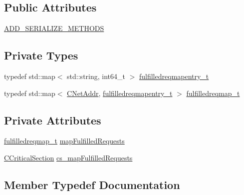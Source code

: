 \subsection*{Public Attributes}
\begin{DoxyCompactItemize}
\item 
\mbox{\hyperlink{class_c_net_fulfilled_request_manager_a252b6b3f7606d6a8de6e9506c1d09621}{A\+D\+D\+\_\+\+S\+E\+R\+I\+A\+L\+I\+Z\+E\+\_\+\+M\+E\+T\+H\+O\+DS}}
\end{DoxyCompactItemize}
\subsection*{Private Types}
\begin{DoxyCompactItemize}
\item 
typedef std\+::map$<$ std\+::string, int64\+\_\+t $>$ \mbox{\hyperlink{class_c_net_fulfilled_request_manager_abd91edcf71a75eb9459f0e5997d39570}{fulfilledreqmapentry\+\_\+t}}
\item 
typedef std\+::map$<$ \mbox{\hyperlink{class_c_net_addr}{C\+Net\+Addr}}, \mbox{\hyperlink{class_c_net_fulfilled_request_manager_abd91edcf71a75eb9459f0e5997d39570}{fulfilledreqmapentry\+\_\+t}} $>$ \mbox{\hyperlink{class_c_net_fulfilled_request_manager_a08e49de0fb5f459a2238c98720b1b420}{fulfilledreqmap\+\_\+t}}
\end{DoxyCompactItemize}
\subsection*{Private Attributes}
\begin{DoxyCompactItemize}
\item 
\mbox{\hyperlink{class_c_net_fulfilled_request_manager_a08e49de0fb5f459a2238c98720b1b420}{fulfilledreqmap\+\_\+t}} \mbox{\hyperlink{class_c_net_fulfilled_request_manager_af0ebb4a55c60aca33d85295caa611ecf}{map\+Fulfilled\+Requests}}
\item 
\mbox{\hyperlink{sync_8h_a37a4692b2d517f2843655ca11af7668a}{C\+Critical\+Section}} \mbox{\hyperlink{class_c_net_fulfilled_request_manager_a0bdc65b6b9e522c95cec8fe21f04cc72}{cs\+\_\+map\+Fulfilled\+Requests}}
\end{DoxyCompactItemize}


\subsection{Member Typedef Documentation}
\mbox{\label{class_c_net_fulfilled_request_manager_a08e49de0fb5f459a2238c98720b1b420}} 

